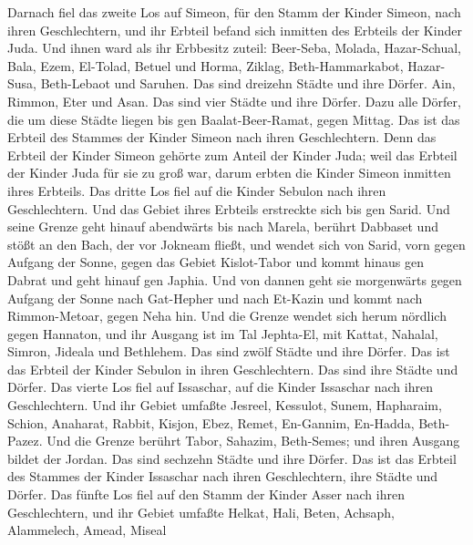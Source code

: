  Darnach fiel das zweite Los auf Simeon, für den Stamm der
Kinder Simeon, nach ihren Geschlechtern, und ihr Erbteil befand sich
inmitten des Erbteils der Kinder Juda.  Und ihnen ward als
ihr Erbbesitz zuteil: Beer-Seba,  Molada, Hazar-Schual,
Bala,  Ezem, El-Tolad, Betuel und Horma, 
Ziklag, Beth-Hammarkabot, Hazar-Susa, Beth-Lebaot und Saruhen.
 Das sind dreizehn Städte und ihre Dörfer. Ain, Rimmon,
Eter und Asan.  Das sind vier Städte und ihre Dörfer.
 Dazu alle Dörfer, die um diese Städte liegen bis gen
Baalat-Beer-Ramat, gegen Mittag. Das ist das Erbteil des Stammes der
Kinder Simeon nach ihren Geschlechtern.  Denn das Erbteil
der Kinder Simeon gehörte zum Anteil der Kinder Juda; weil das Erbteil
der Kinder Juda für sie zu groß war, darum erbten die Kinder Simeon
inmitten ihres Erbteils.  Das dritte Los fiel auf die
Kinder Sebulon nach ihren Geschlechtern. Und das Gebiet ihres Erbteils
erstreckte sich bis gen Sarid.  Und seine Grenze geht
hinauf abendwärts bis nach Marela, berührt Dabbaset und stößt an den
Bach, der vor Jokneam fließt,  und wendet sich von Sarid,
vorn gegen Aufgang der Sonne, gegen das Gebiet Kislot-Tabor und kommt
hinaus gen Dabrat und geht hinauf gen Japhia.  Und von
dannen geht sie morgenwärts gegen Aufgang der Sonne nach Gat-Hepher und
nach Et-Kazin und kommt nach Rimmon-Metoar, gegen Neha hin.
 Und die Grenze wendet sich herum nördlich gegen
Hannaton, und ihr Ausgang ist im Tal Jephta-El,  mit
Kattat, Nahalal, Simron, Jideala und Bethlehem. Das sind zwölf Städte
und ihre Dörfer.  Das ist das Erbteil der Kinder Sebulon
in ihren Geschlechtern. Das sind ihre Städte und Dörfer. 
Das vierte Los fiel auf Issaschar, auf die Kinder Issaschar nach ihren
Geschlechtern.  Und ihr Gebiet umfaßte Jesreel,
 Kessulot, Sunem, Hapharaim,  Schion,
Anaharat, Rabbit, Kisjon,  Ebez, Remet, En-Gannim,
En-Hadda, Beth-Pazez.  Und die Grenze berührt Tabor,
Sahazim, Beth-Semes; und ihren Ausgang bildet der Jordan. Das sind
sechzehn Städte und ihre Dörfer.  Das ist das Erbteil des
Stammes der Kinder Issaschar nach ihren Geschlechtern, ihre Städte und
Dörfer.  Das fünfte Los fiel auf den Stamm der Kinder
Asser nach ihren Geschlechtern,  und ihr Gebiet umfaßte
Helkat,  Hali, Beten, Achsaph, Alammelech, Amead, Miseal
